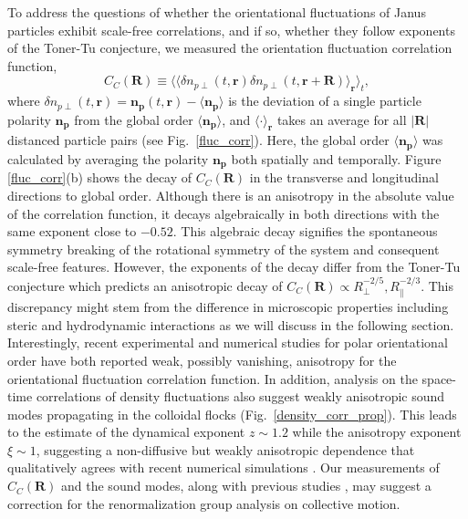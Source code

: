 \documentclass[%
 reprint,
 amsmath,amssymb,
 aps,
 floatfix
]{revtex4-2}
\begin{document}
To address the questions of whether the orientational fluctuations of Janus particles exhibit scale-free correlations, and if so, whether they follow exponents of the Toner-Tu conjecture, we measured the orientation fluctuation correlation function,
\begin{equation}
C_C(\bm{R}) \equiv \langle \langle \delta n_{p\perp}(t,\bm{r}) \delta n_{p\perp}(t,\bm{r}+\bm{R}) \rangle_{\bm{r}} \rangle_t,
\end{equation}
where $\delta n_{p\perp}(t,\bm{r}) = \bm{n_p}(t,\bm{r}) - \langle\bm{n_{p}\rangle}$ is the deviation of a single particle polarity $\bm{n_p}$ from the global order $\langle\bm{n_{p}\rangle}$, and $\langle\cdot\rangle_{\bm{r}}$ takes an average for all $|\bm{R}|$ distanced particle pairs (see Fig.~\ref{fluc_corr}). 
Here, the global order $\langle\bm{n_{p}\rangle}$ was calculated by averaging the polarity $\bm{n_p}$ both spatially and temporally. 
Figure \ref{fluc_corr}(b) shows the decay of $C_C(\bm{R})$ in the transverse and longitudinal directions to global order.
Although there is an anisotropy in the absolute value of the correlation function, 
it decays algebraically in both directions with the same exponent close to $-0.52$.
This algebraic decay signifies the spontaneous symmetry breaking of the rotational symmetry of the system and consequent scale-free features.
However, the exponents of the decay differ from the Toner-Tu conjecture which predicts an anisotropic decay of $C_C(\bm{R})\propto R_\perp^{-2/5}, R_\parallel^{-2/3}$.
This discrepancy might stem from the difference in microscopic properties including steric and hydrodynamic interactions as we will discuss in the following section.
Interestingly, recent experimental \cite{bartolo2018} and numerical \cite{benoit2019} studies for polar orientational order have both reported weak, possibly vanishing, anisotropy for the orientational fluctuation correlation function.
In addition, analysis on the space-time correlations of density fluctuations also suggest weakly anisotropic sound modes propagating in the colloidal flocks (Fig.~\ref{density_corr_prop}). 
This leads to the estimate of the dynamical exponent $z\sim1.2$ while the anisotropy exponent $\xi\sim1$, suggesting a non-diffusive but weakly anisotropic dependence that qualitatively agrees with recent numerical simulations  \cite{benoit2019}.
Our measurements of $C_C(\bm{R})$ and the sound modes, along with previous studies \cite{benoit2019}, may suggest a correction for the renormalization group analysis on collective motion.
\end{document}
